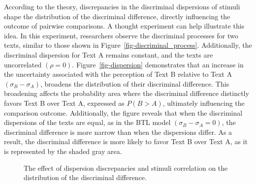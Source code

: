\documentclass[
  authoryear,
  review,
  1p]{elsarticle}
\begin{document}
According to the theory, discrepancies in the discriminal dispersions of
stimuli shape the distribution of the discriminal difference, directly
influencing the outcome of pairwise comparisons. A thought experiment
can help illustrate this idea. In this experiment, researchers observe
the discriminal processes for two texts, similar to those shown in
Figure~\ref{fig-discriminal_process}. Additionally, the discriminal
dispersion for Text A remains constant, and the texts are uncorrelated
\((\rho=0)\). Figure~\ref{fig-dispersion} demonstrates that an increase
in the uncertainty associated with the perception of Text B relative to
Text A \((\sigma_{B} - \sigma_{A})\), broadens the distribution of their
discriminal difference. This broadening affects the probability area
where the discriminal difference distinctly favors Text B over Text A,
expressed as \(P(B>A)\), ultimately influencing the comparison outcome.
Additionally, the figure reveals that when the discriminal dispersions
of the texts are equal, as in the BTL model
\((\sigma_{B} - \sigma_{A}=0)\), the discriminal difference is more
narrow than when the dispersions differ. As a result, the discriminal
difference is more likely to favor Text B over Text A, as it is
represented by the shaded gray area.

\begin{figure}

\begin{minipage}{0.50\linewidth}



\end{minipage}%
%
\begin{minipage}{0.50\linewidth}



\end{minipage}%

\caption{\label{fig-casev_issues}The effect of dispersion discrepancies
and stimuli correlation on the distribution of the discriminal
difference.}

\end{figure}%
\end{document}
